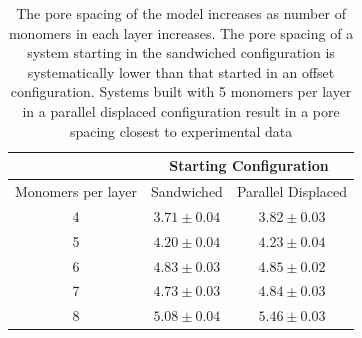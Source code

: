 \documentclass{article}
\begin{document}
  \begin{table}[H]
  \centering
  \begin{tabular}{ccc}
  \toprule
  		   & \multicolumn{2}{c}{Starting Configuration} \\
  \hline
  Monomers per layer & Sandwiched & Parallel Displaced \\
  \midrule
  4 & $3.71 \pm 0.04$ & $3.82 \pm 0.03$ \\
  5 & $4.20 \pm 0.04$ & $4.23 \pm 0.04$ \\
  6 & $4.83 \pm 0.03$ & $4.85 \pm 0.02$ \\
  7 & $4.73 \pm 0.03$ & $4.84 \pm 0.03$ \\
  8 & $5.08 \pm 0.04$ & $5.46 \pm 0.03$ \\
  \bottomrule
  \end{tabular}
  \caption{The pore spacing of the model increases as number of monomers
  in each layer increases. The pore spacing of a system starting in the 
  sandwiched configuration is systematically lower than that started in an 
  offset configuration. Systems built with 5 monomers per layer in a parallel
  displaced configuration result in a pore spacing closest to experimental
  data}\label{table:p2p} 
  \end{table}
  
\end{document}
